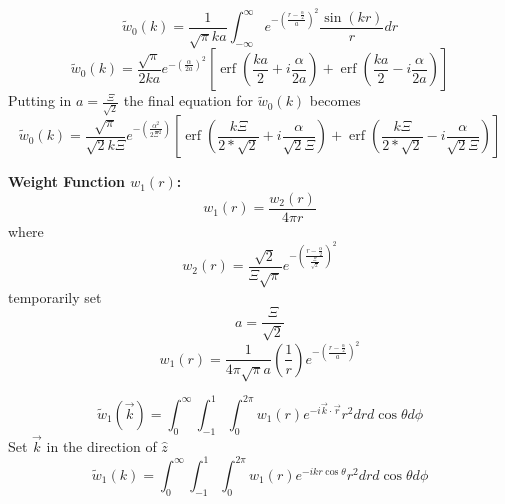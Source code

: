 \documentclass[letterpaper,twocolumn,amsmath,amssymb,prb]{revtex4-1}
\begin{document}
\begin{widetext}
\begin{displaymath}{\widetilde{w}_0(k)=\frac{1}{\sqrt{\pi}ka}\int_{-\infty}^{\infty}e^{-\left(\frac{r-\frac{\alpha}{2}}{a}\right)^2}\frac{\sin(kr)}{r}d{r}}\end{displaymath}
\[{}\]
\begin{equation}{\widetilde{w}_0(k)=\frac{\sqrt{\pi}}{2ka}e^{-\left(\frac{\alpha}{2a}\right)^2}\left[\operatorname{erf}\left(\frac{ka}{2}+i\frac{\alpha}{2a}\right)+\operatorname{erf}\left(\frac{ka}{2}-i\frac{\alpha}{2a}\right)\right]}\end{equation}
\[{}\] %
Putting in $a=\frac{\Xi}{\sqrt{2}}$ the final equation for $\widetilde{w}_0(k)$ becomes
\begin{equation}{\widetilde{w}_0(k)=\frac{\sqrt{\pi}}{\sqrt{2}k\Xi}e^{-\left(\frac{\alpha^2}{2\Xi^2}\right)}\left[\operatorname{erf}\left(\frac{k\Xi}{2*\sqrt{2}}+i\frac{\alpha}{\sqrt{2}\Xi}\right)+\operatorname{erf}\left(\frac{k\Xi}{2*\sqrt{2}}-i\frac{\alpha}{\sqrt{2}\Xi}\right)\right]}\end{equation}
\color{black}

\noindent\textbf{Weight Function $w_1(r)$:}
\begin{equation}{w_1(r)=\frac{w_2(r)}{4{\pi}r}}\end{equation}
where
\begin{equation}{w_2(r)=\frac{\sqrt{2}}{\Xi\sqrt{\pi}}e^{-\left(\frac{r-\frac{\alpha}{2}}{\frac{\Xi}{\sqrt{2}}}\right)^2}}\end{equation}
temporarily set 
\begin{equation}{a=\frac{\Xi}{\sqrt{2}}}\end{equation}
\begin{equation}{w_1(r)=\frac{1}{4{\pi}\sqrt{\pi}a}\left(\frac{1}{r}\right)e^{-\left(\frac{r-\frac{\alpha}{2}}{a}\right)^2}}\end{equation}

\begin{equation}{\widetilde{w}_1(\vec{k})=\int_{0}^{\infty}\int_{-1}^{1}\int_{0}^{2\pi}w_1(r)e^{-i\vec{k}\cdot{\vec{r}}}r^2d{r}d{\cos\theta}d{\phi}}\end{equation}
Set $\vec{k}$ in the direction of $\hat{z}$ 
\begin{equation}{\widetilde{w}_1(k)=\int_{0}^{\infty}\int_{-1}^{1}\int_{0}^{2\pi}w_1(r)e^{-ikr\cos\theta}r^2d{r}d{\cos\theta}d{\phi}}\end{equation}


\end{widetext}
\end{document}
